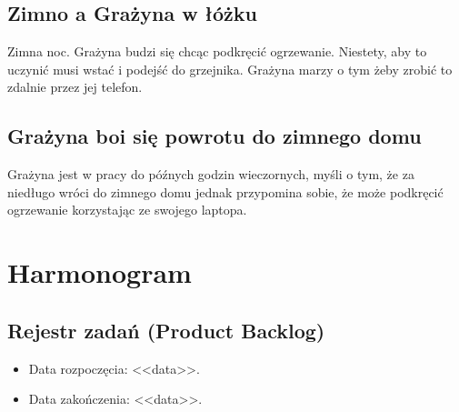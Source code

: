 	\subsection{Zimno a Grażyna w łóżku}
	 Zimna noc. Grażyna budzi się chcąc podkręcić ogrzewanie. Niestety, aby to uczynić musi wstać i podejść do grzejnika. Grażyna marzy o tym żeby zrobić to zdalnie przez jej telefon.
	
	\subsection{Grażyna boi się powrotu do zimnego domu}
	Grażyna jest w pracy do późnych godzin wieczornych, myśli o tym, że za niedługo wróci do zimnego domu jednak przypomina sobie, że może podkręcić ogrzewanie korzystając ze swojego laptopa.
	
	
	\section{Harmonogram}
	
	\subsection{Rejestr zadań (Product Backlog)}
	
	\begin{itemize}
		\item Data rozpoczęcia: <<data>>.
		\item  Data zakończenia: <<data>>.
	\end{itemize}